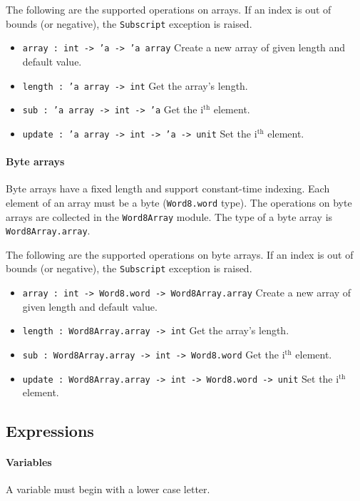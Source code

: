\documentclass{article}
\begin{document}
The following are the supported operations on arrays. If an index is out of bounds (or negative), the \texttt{Subscript} exception is raised.
\begin{itemize}
\item \texttt{array : int -> 'a -> 'a array} Create a new array of given length and default value.
\item \texttt{length : 'a array -> int} Get the array's length.
\item \texttt{sub : 'a array -> int -> 'a} Get the i$^\textrm{th}$ element.
\item \texttt{update : 'a array -> int -> 'a -> unit} Set the i$^\textrm{th}$ element.
\end{itemize}


\paragraph{Byte arrays}
Byte arrays have a fixed length and support constant-time indexing. Each element of an array must be a byte (\texttt{Word8.word} type). The operations on byte arrays are collected in the \texttt{Word8Array} module. The type of a byte array is \texttt{Word8Array.array}.

The following are the supported operations on byte arrays. If an index is out of bounds (or negative), the \texttt{Subscript} exception is raised.
\begin{itemize}
\item \texttt{array : int -> Word8.word -> Word8Array.array} Create a new array of given length and default value.
\item \texttt{length : Word8Array.array -> int} Get the array's length.
\item \texttt{sub : Word8Array.array -> int -> Word8.word} Get the i$^\textrm{th}$ element.
\item \texttt{update : Word8Array.array -> int -> Word8.word -> unit} Set the i$^\textrm{th}$ element.
\end{itemize}

\subsection{Expressions}
\label{expressions}

\paragraph{Variables}

A variable must begin with a lower case letter.
\end{document}

